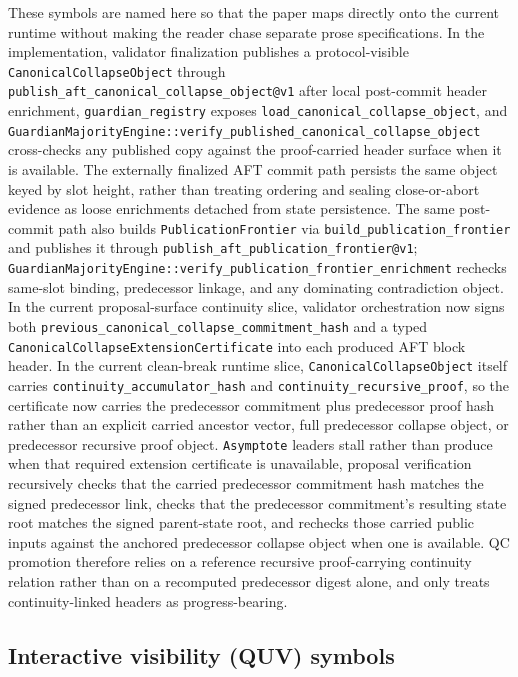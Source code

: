 \documentclass[11pt]{article}
\newcommand{\code}[1]{\texttt{#1}}
\begin{document}
These symbols are named here so that the paper maps directly onto the current
runtime without making the reader chase separate prose specifications. In the
implementation, validator finalization publishes a protocol-visible
\code{CanonicalCollapseObject} through
\code{publish\_aft\_canonical\_collapse\_object@v1} after local post-commit
header enrichment, \code{guardian\_registry} exposes
\code{load\_canonical\_collapse\_object}, and
\code{GuardianMajorityEngine::verify\_published\_canonical\_collapse\_object}
cross-checks any published copy against the proof-carried header surface when
it is available. The externally finalized AFT commit path persists the same
object keyed by slot height, rather than treating ordering and sealing
close-or-abort evidence as loose enrichments detached from state persistence.
The same post-commit path also builds \code{PublicationFrontier} via
\code{build\_publication\_frontier} and publishes it through
\code{publish\_aft\_publication\_frontier@v1};
\code{GuardianMajorityEngine::verify\_publication\_frontier\_enrichment}
rechecks same-slot binding, predecessor linkage, and any dominating
contradiction object.
In the current proposal-surface continuity slice, validator orchestration now
signs both \code{previous\_canonical\_collapse\_commitment\_hash} and a typed
\code{CanonicalCollapseExtensionCertificate} into each produced AFT block
header.
In the current clean-break runtime slice, \code{CanonicalCollapseObject}
itself carries \code{continuity\_accumulator\_hash} and
\code{continuity\_recursive\_proof}, so the certificate now carries the
predecessor commitment plus predecessor proof hash rather than an explicit
carried ancestor vector, full predecessor collapse object, or predecessor
recursive proof object.
\code{Asymptote} leaders stall rather than produce when that required
extension certificate is unavailable, proposal verification recursively
checks that the carried predecessor commitment hash matches the signed
predecessor link, checks that the predecessor commitment's resulting state root matches the
signed parent-state root, and rechecks those carried public inputs against the
anchored predecessor collapse object when one is available. QC promotion
therefore relies on a reference recursive proof-carrying continuity relation
rather than on a recomputed predecessor digest alone, and only treats continuity-linked
headers as progress-bearing.

\subsection{Interactive visibility (QUV) symbols}
\end{document}
